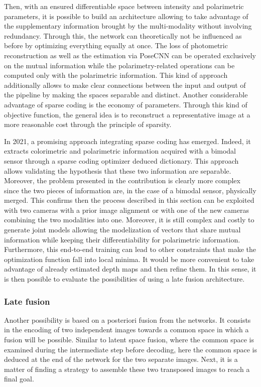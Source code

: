 Then, with an ensured differentiable space between intensity and polarimetric parameters, it is possible to build an architecture allowing to take advantage of the supplementary information brought by the multi-modality without involving redundancy. Through this, the network can theoretically not be influenced as before by optimizing everything equally at once. The loss of photometric reconstruction as well as the estimation via PoseCNN can be operated exclusively on the mutual information while the polarimetry-related operations can be computed only with the polarimetric information.
This kind of approach additionally allows to make clear connections between the input and output of the pipeline by making the spaces separable and distinct.
Another considerable advantage of sparse coding is the economy of parameters. Through this kind of objective function, the general idea is to reconstruct a representative image at a more reasonable cost through the principle of sparsity.


In 2021, a promising approach \cite{wen2021sparse} integrating sparse coding has emerged. Indeed, it extracts colorimetric and polarimetric information acquired with a bimodal sensor through a sparse coding optimizer deduced dictionary.
This approach allows validating the hypothesis that these two information are separable. Moreover, the problem presented in the contribution is clearly more complex since the two pieces of information are, in the case of a bimodal sensor, physically merged. This confirms then the process described in this section can be exploited with two cameras with a prior image alignment or with one of the new cameras combining the two modalities into one.
Moreover, it is still complex and costly to generate joint models allowing the modelization of vectors that share mutual information while keeping their differentiability for polarimetric information. Furthermore, this end-to-end training can lead to other constraints that make the optimization function fall into local minima. It would be more convenient to take advantage of already estimated depth maps and then refine them. In this sense, it is then possible to evaluate the possibilities of using a late fusion architecture.


\subsubsection{Late fusion}

Another possibility is based on a posteriori fusion from the networks. It consists in the encoding of two independent images towards a common space in which a fusion will be possible. Similar to latent space fusion, where the common space is examined during the intermediate step before decoding, here the common space is deduced at the end of the network for the two separate images.
Next, it is a matter of finding a strategy to assemble these two transposed images to reach a final goal.

